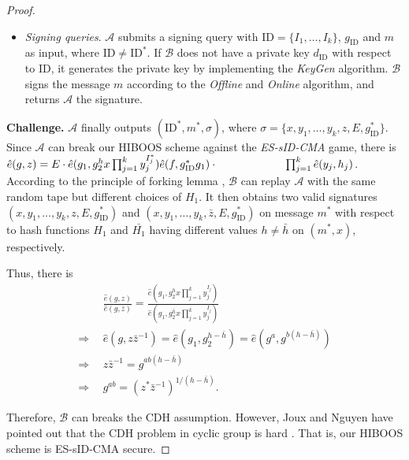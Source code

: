 \documentclass[times]{secauth}
\theoremstyle{definition}
\theoremstyle{remark}
\begin{document}
\begin{proof}
\begin{itemize}
	\item \emph{Signing queries}. 
	$\mathcal{A}$ submits a signing query with $\mathrm{ID} = \{I_1, \ldots, I_k\}$, $g_\mathrm{ID}$ and $m$ as input, where $\mathrm{ID} \neq \mathrm{ID}^*$.
	If $\mathcal{B}$ does not have a private key $d_{\mathrm{ID}}$ with respect to ID, it generates the private key by implementing the \emph{KeyGen} algorithm.	
	$\mathcal{B}$ signs the message $m$ according to the \emph{Offline} and \emph{Online} algorithm, and returns $\mathcal{A}$ the signature.
\end{itemize}
\textbf{Challenge.} 
$\mathcal{A}$ finally outputs $(\mathrm{ID}^*, m^*, \sigma)$, where $ \sigma=\{x, y_1, \ldots, y_k, z, E, g_{\mathrm{ID}}^*\}$. 
Since $\mathcal{A}$ can break our HIBOOS scheme against the \emph{ES-sID-CMA} game, there is $\hat{e}(g, z) = E \cdot \hat{e}(g_1, g_2^hx\prod_{j=1}^k y^{I^*_j}_j)\hat{e}(f, g_\mathrm{ID}^*g_1)\cdot \\ ~~~~~~~~~~~~~~~~~~\prod_{j=1}^k \hat{e}(y_j, h_j)$.
\\
According to the principle of forking lemma \cite{Pointcheval1996security}, $\mathcal{B}$ can replay $\mathcal{A}$ with the same random tape but different choices of $H_1$.
It then obtains two valid signatures $(x, y_1, \ldots, y_k, z, E, g_\mathrm{ID}^*)$ and $(x, y_1, \ldots, y_k, \bar{z}, E, g_\mathrm{ID}^*)$ on message $m^*$ with respect to hash functions $H_1$ and $\bar{H_1}$ having different values $h \neq \bar{h}$ on $(m^*, x)$, respectively. \par
Thus, there is 
\begin{align*}
&\frac{\hat{e}(g, z)}{\hat{e}(g, \bar{z})} = \frac{\hat{e}(g_1, g_2^hx\prod_{j=1}^k y_j^{I_j})}{\hat{e}(g_1, g_2^{\bar{h}}x\prod_{j=1}^k y_j^{I_j})}\\
\Rightarrow~~ &\hat{e}(g, z\bar{z}^{-1}) = \hat{e}(g_1, g_2^{h-\bar{h}})=\hat{e}(g^a, g^{b(h-\bar{h})})\\
\Rightarrow~~ &z\bar{z}^{-1} = g^{ab(h-\bar{h})}\\
\Rightarrow~~ &g^{ab} = (z^*\bar{z}^{-1})^{1/(h-\bar{h})}.
\end{align*}
\par
Therefore, $\mathcal{B}$ can breaks the CDH assumption.
However, Joux and Nguyen have pointed out that the CDH problem in cyclic group is hard \cite{joux2003separating}. 
That is, our HIBOOS scheme is ES-sID-CMA secure.
\end{proof}
\end{document}
